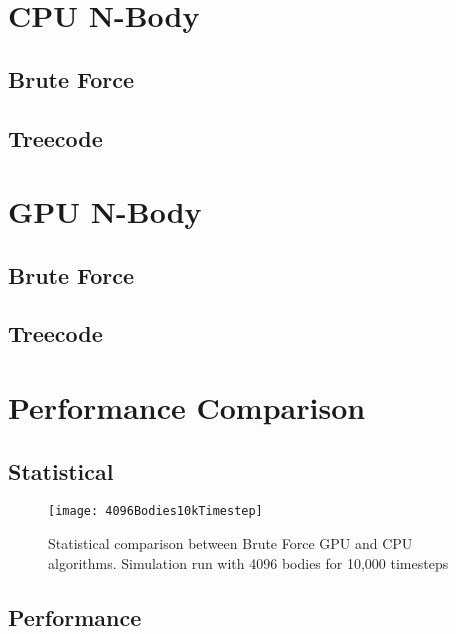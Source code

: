 \documentclass{thesis}
\begin{document}
\section{CPU N-Body}
\subsection{Brute Force}
\subsection{Treecode}
\section{GPU N-Body}
\subsection{Brute Force}
\subsection{Treecode}
\section{Performance Comparison}
\subsection{Statistical}
\begin{figure}[h]
    \caption{Statistical comparison between Brute Force GPU and CPU algorithms. Simulation run with 4096 bodies for 10,000 timesteps}
    \label{fig:test}
    \centering
    \texttt{[image: 4096Bodies10kTimestep]}
\end{figure}
\subsection{Performance}
\end{document}
